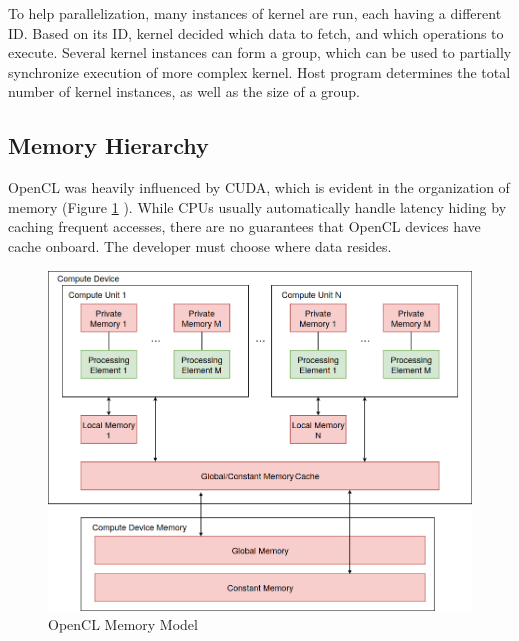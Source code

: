 \noindent To help parallelization, many instances of kernel are run, each having a different ID. Based on its ID, kernel decided which data to fetch, and which operations to execute. Several kernel instances can form a group, which can be used to partially synchronize execution of more complex kernel. Host program determines the total number of kernel instances, as well as the size of a group.

\subsection{Memory Hierarchy}
OpenCL was heavily influenced by CUDA, which is evident in the organization of memory (Figure \ref{fig:openclmemory} \cite{munshi2009opencl}). While CPUs usually automatically handle latency hiding by caching frequent accesses, there are no guarantees that OpenCL devices have cache onboard. The developer must choose where data resides.

\begin{figure}[h]
    \includegraphics[width=\linewidth]{Figures/openclmem.png}
    \caption{OpenCL Memory Model}
    \label{fig:openclmemory}
\end{figure}

